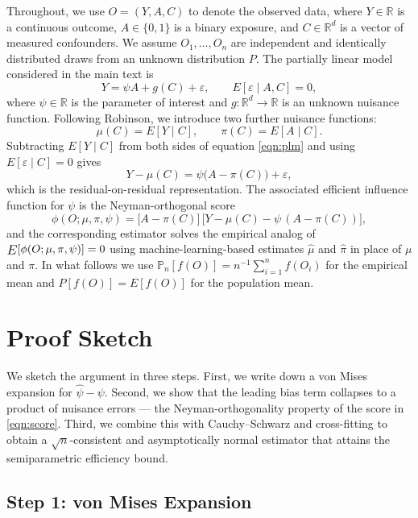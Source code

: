 \documentclass[12pt]{article}
\newcommand{\E}{\mathop{\vcenter{\hbox{\relsize{+1}$E$}}}}
\newcommand{\Pn}{\mathbb{P}_n}
\begin{document}
Throughout, we use $O = (Y, A, C)$ to denote the observed data, where $Y \in \mathbb{R}$ is a continuous outcome, $A \in \{0, 1\}$ is a binary exposure, and $C \in \mathbb{R}^d$ is a vector of measured confounders. We assume $O_1, \ldots, O_n$ are independent and identically distributed draws from an unknown distribution $P$. The partially linear model considered in the main text is
\begin{equation}
Y = \psi A + g(C) + \varepsilon, \qquad E[\varepsilon \mid A, C] = 0, \label{eqn:plm}
\end{equation}
where $\psi \in \mathbb{R}$ is the parameter of interest and $g: \mathbb{R}^d \to \mathbb{R}$ is an unknown nuisance function. Following Robinson,\cite{Robinson1988} we introduce two further nuisance functions:
$$\mu(C) = E[Y \mid C], \qquad \pi(C) = E[A \mid C].$$
Subtracting $E[Y \mid C]$ from both sides of equation \ref{eqn:plm} and using $E[\varepsilon \mid C] = 0$ gives
\begin{equation}
Y - \mu(C) = \psi \big( A - \pi(C) \big) + \varepsilon, \label{eqn:ronr}
\end{equation}
which is the residual-on-residual representation. The associated efficient influence function for $\psi$ is the Neyman-orthogonal score
\begin{equation}
\phi(O; \mu, \pi, \psi) = \big[A - \pi(C)\big] \, \big[ Y - \mu(C) - \psi \, (A - \pi(C)) \big], \label{eqn:score}
\end{equation}
and the corresponding estimator solves the empirical analog of $\E[\phi(O; \mu, \pi, \psi)] = 0$ using machine-learning-based estimates $\hat{\mu}$ and $\hat{\pi}$ in place of $\mu$ and $\pi$. In what follows we use $\Pn[f(O)] = n^{-1} \sum_{i=1}^n f(O_i)$ for the empirical mean and $P[f(O)] = E[f(O)]$ for the population mean.

\section{Proof Sketch}

We sketch the argument in three steps. First, we write down a von Mises expansion for $\hat{\psi} - \psi$. Second, we show that the leading bias term collapses to a product of nuisance errors --- the Neyman-orthogonality property of the score in \ref{eqn:score}. Third, we combine this with Cauchy--Schwarz and cross-fitting to obtain a $\sqrt{n}$-consistent and asymptotically normal estimator that attains the semiparametric efficiency bound.

\subsection{Step 1: von Mises Expansion}
\end{document}
